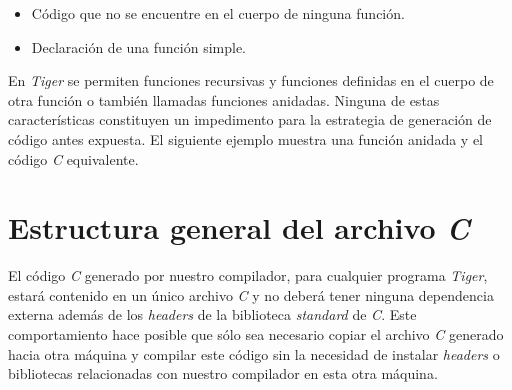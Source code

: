 \documentclass{article}
\begin{document}
\begin{itemize}
  \item Código que no se encuentre en el cuerpo de ninguna función.
    
    \begin{quote}
    
    \end{quote}
    
    \begin{quote}
    
    \end{quote}
    
  \item Declaración de una función simple.
    
    \begin{quote}
    
    \end{quote}
    
    \begin{quote}
    
    \end{quote} 
\end{itemize}

En \textit{Tiger} se permiten funciones recursivas y funciones definidas en el
cuerpo de otra función o también llamadas funciones anidadas. Ninguna de estas
características constituyen un impedimento para la estrategia de generación de
código antes expuesta. El siguiente ejemplo muestra una función anidada y el
código \textit{C} equivalente.

\begin{quote}

\end{quote}

\begin{quote}

\end{quote}

\section{Estructura general del archivo \emph{C}}

El código \emph{C} generado por nuestro compilador, para cualquier programa
\emph{Tiger}, estará contenido en un único archivo \emph{C} y no deberá tener
ninguna dependencia externa además de los \emph{headers} de la biblioteca
\emph{standard} de \emph{C}. Este comportamiento hace posible que sólo sea
necesario copiar el archivo \emph{C} generado hacia otra máquina y compilar
este código sin la necesidad de instalar \emph{headers} o bibliotecas
relacionadas con nuestro compilador en esta otra máquina. 
\end{document}
